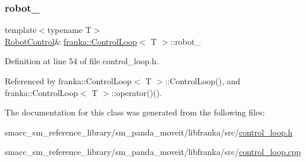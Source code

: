 \subsubsection{\texorpdfstring{robot\+\_\+}{robot\_}}
{\footnotesize\ttfamily template$<$typename T$>$ \\
\hyperlink{classfranka_1_1RobotControl}{Robot\+Control}\& \hyperlink{classfranka_1_1ControlLoop}{franka\+::\+Control\+Loop}$<$ T $>$\+::robot\+\_\+\hspace{0.3cm}{\ttfamily [private]}}



Definition at line 54 of file control\+\_\+loop.\+h.



Referenced by franka\+::\+Control\+Loop$<$ T $>$\+::\+Control\+Loop(), and franka\+::\+Control\+Loop$<$ T $>$\+::operator()().



The documentation for this class was generated from the following files\+:\begin{DoxyCompactItemize}
\item 
smacc\+\_\+sm\+\_\+reference\+\_\+library/sm\+\_\+panda\+\_\+moveit/libfranka/src/\hyperlink{control__loop_8h}{control\+\_\+loop.\+h}\item 
smacc\+\_\+sm\+\_\+reference\+\_\+library/sm\+\_\+panda\+\_\+moveit/libfranka/src/\hyperlink{control__loop_8cpp}{control\+\_\+loop.\+cpp}\end{DoxyCompactItemize}
